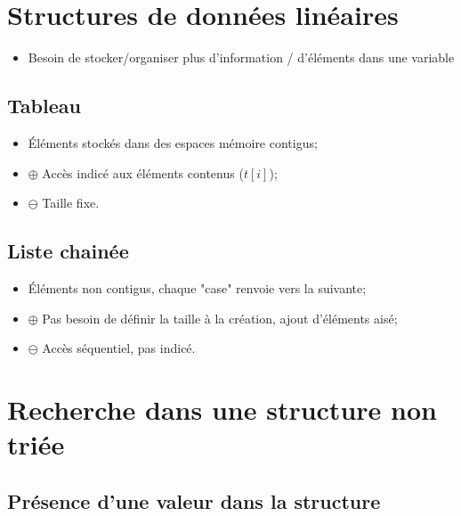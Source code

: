 \documentclass[12pt,a4paper]{article}
\date{}
\begin{document}


\section{Structures de données linéaires}

\begin{itemize}
	\item Besoin de stocker/organiser plus d'information / d'éléments dans une variable
\end{itemize}

\subsection{Tableau}
	\begin{itemize}
		\item Éléments stockés dans des espaces mémoire contigus;
		\item $\oplus$  Accès indicé aux éléments contenus ($t[i]$);
		\item $\ominus$ Taille fixe.
	\end{itemize}
	

\subsection{Liste chainée}

	\begin{itemize}
		\item \'Eléments non contigus, chaque "case" renvoie vers la suivante;
		\item  $\oplus$ Pas besoin de définir la taille à la création, ajout d'éléments aisé;
		\item $\ominus$ Accès séquentiel, pas indicé.
	\end{itemize}

\section{Recherche dans une structure non triée}

\subsection{Présence d'une valeur dans la structure}
\end{document}
